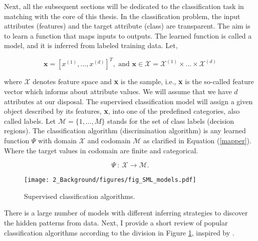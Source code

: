     



Next, all the subsequent sections will be dedicated to the classification task in matching with the core of this thesis. In the classification problem, the input attributes (features) and the target attribute (class) are transparent. The aim is to learn a function that maps inputs to outputs. The learned function is called a model, and it is inferred from labeled training data. Let, 

\begin{equation}\label{eq:classification}
\textbf{x}=\left[x^{(1)},..., x^{(d)}\right]^T,\textrm{ and } \textbf{x}\in \mathcal{X}=\mathcal{X}^{(1)}\times ... \times \mathcal{X}^{(d)}
\end{equation}
 
\noindent where $\mathcal{X} $ denotes feature space and \textbf{x} is the sample, i.e., \textbf{x} is the so-called feature vector which informs about attribute values. We will assume that we have $d$ attributes at our disposal. The supervised classification model will assign a given object described by its features, \textbf{x}, into one of the predefined categories, also called labels. Let $\mathcal{M}=\{1,..., M\}$ stands for the set of class labels (decision regions). The classification algorithm (discrimination algorithm) is any learned function $\Psi$ with domain $\mathcal{X}$ and codomain $\mathcal{M}$ as clarified in Equation (\ref{mapper}). Where the target values in codomain are finite and categorical.  

\begin{equation}\label{mapper}
\Psi\: :\: \mathcal{X} \to \mathcal{M}.
\end{equation}

\begin{figure}[!ht]
    \centering
    \texttt{[image: 2\_Background/figures/fig\_SML\_models.pdf]}
    \caption{Supervised classification algorithms.}
    \label{ch2:cl.sml}
\end{figure}

There is a large number of models with different inferring strategies to discover the hidden patterns from data. Next, I provide a short review of popular classification algorithms according to the division in Figure \ref{ch2:cl.sml}, inspired by \cite{garcia2015}.  

